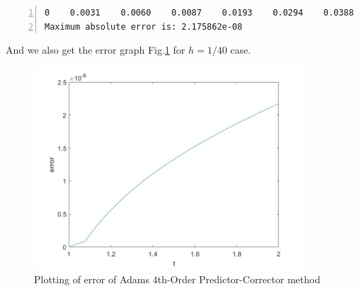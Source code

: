 \documentclass{article}
\begin{document}
\begin{enumerate}
\begin{enumerate}[wide=10pt]
\begin{lstlisting}[frame=single, numbers=left, style=Matlab-editor]
         0    0.0031    0.0060    0.0087    0.0193    0.0294    0.0388    0.0477    0.0562    0.0642    0.0718    0.0791    0.0860    0.0927    0.0991    0.1052    0.1112    0.1169    0.1224    0.1278    0.1330    0.1381    0.1430    0.1479    0.1526    0.1572    0.1617    0.1661    0.1704    0.1747    0.1788    0.1830    0.1870    0.1910    0.1949    0.1988    0.2027    0.2064    0.2102    0.2139    0.2176
Maximum absolute error is: 2.175862e-08
        \end{lstlisting} And we also get the error graph Fig.\ref{fig:Adams_4th_Order_Predictor_Corrector_Method_Error_Graph} for $h=1/40$ case. \begin{figure}[h] %
            \includegraphics[width=0.9\textwidth]{assignment_5_3_2_fig.jpg}
            \centering
            \caption{Plotting of error of Adams 4th-Order Predictor-Corrector method}
            \label{fig:Adams_4th_Order_Predictor_Corrector_Method_Error_Graph}
        \end{figure}


\end{enumerate}
\end{enumerate}
\end{document}
